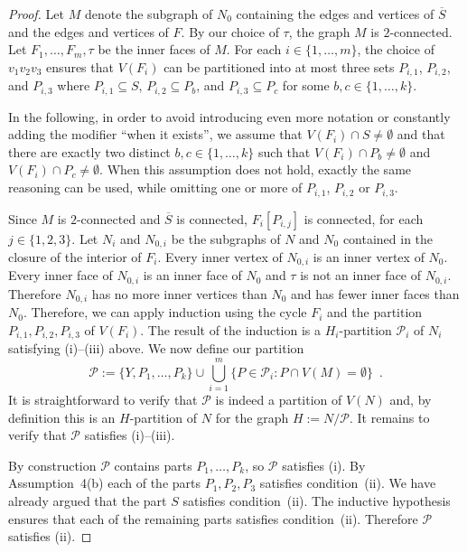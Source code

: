\documentclass{patmorin}
\theoremstyle{plain}
\theoremstyle{definition}
\begin{document}
\begin{proof}
  Let $M$ denote the subgraph of $N_0$ containing the edges and vertices of $\overline{S}$ and the edges and vertices of $F$. By our choice of $\tau$, the graph $M$ is $2$-connected. Let $F_1,\ldots,F_m,\tau$ be the inner faces of $M$. For each $i\in\{1,\ldots,m\}$, the choice of $v_1v_2v_3$ ensures that $V(F_i)$ can be partitioned into at most three sets $P_{i,1}$, $P_{i,2}$, and $P_{i,3}$ where $P_{i,1}\subseteq S$, $P_{i,2}\subseteq P_b$, and $P_{i,3}\subseteq P_c$ for some $b,c\in\{1,\ldots,k\}$.

  In the following, in order to avoid introducing even more notation or constantly adding the modifier ``when it exists'', we assume that $V(F_i)\cap S\neq\emptyset$ and that there are exactly two distinct $b,c\in\{1,\ldots,k\}$ such that $V(F_i)\cap P_b\neq\emptyset$ and $V(F_i)\cap P_c\neq\emptyset$.  When this assumption does not hold, exactly the same reasoning can be used, while omitting one or more of $P_{i,1}$, $P_{i,2}$ or $P_{i,3}$.

  Since $M$ is $2$-connected and $\overline{S}$ is connected, $F_i[P_{i,j}]$ is connected, for each $j\in\{1,2,3\}$.  Let $N_i$ and $N_{0,i}$ be the subgraphs of $N$ and $N_0$ contained in the closure of the interior of $F_i$. Every inner vertex of $N_{0,i}$ is an inner vertex of $N_{0}$.  Every inner face of $N_{0,i}$ is an inner face of $N_0$ and $\tau$ is not an inner face of $N_{0,i}$.  Therefore $N_{0,i}$ has no more inner vertices than $N_0$ and has fewer inner faces than $N_{0}$.  Therefore, we can apply induction using the cycle $F_i$ and the partition $P_{i,1},P_{i,2},P_{i,3}$ of $V(F_i)$.  The result of the induction is a $H_i$-partition $\mathcal{P}_i$ of $N_i$ satisfying (i)--(iii) above. We now define our partition
  \[
    \mathcal{P}:=\{Y, P_1,\ldots,P_k\} \cup \bigcup_{i=1}^m \{P\in\mathcal{P}_i: P\cap V(M)=\emptyset\} \enspace .
  \]
  It is straightforward to verify that $\mathcal{P}$ is indeed a partition of $V(N)$ and, by definition this is an $H$-partition of $N$ for the graph $H:=N/\mathcal{P}$.  It remains to verify that $\mathcal{P}$ satisfies (i)--(iii).

  By construction $\mathcal{P}$ contains parts $P_1,\ldots,P_k$, so $\mathcal{P}$ satisfies (i).  By Assumption~4(b) each of the parts $P_1,P_2,P_3$ satisfies condition~(ii).  We have already argued that the part $S$ satisfies condition~(ii).  The inductive hypothesis ensures that each of the remaining parts satisfies condition~(ii).   Therefore $\mathcal{P}$ satisfies (ii).


\end{proof}
\end{document}
